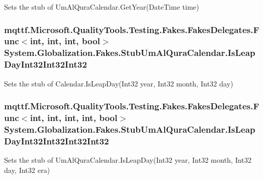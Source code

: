 Sets the stub of Um\-Al\-Qura\-Calendar.\-Get\-Year(\-Date\-Time time)

\hypertarget{class_system_1_1_globalization_1_1_fakes_1_1_stub_um_al_qura_calendar_af5b3de7affdaec6447af89aea8beb108}{
\subsubsection[{Is\-Leap\-Day\-Int32\-Int32\-Int32}]{\setlength{\rightskip}{0pt plus 5cm}mqttf.\-Microsoft.\-Quality\-Tools.\-Testing.\-Fakes.\-Fakes\-Delegates.\-Func$<$int, int, int, bool$>$ System.\-Globalization.\-Fakes.\-Stub\-Um\-Al\-Qura\-Calendar.\-Is\-Leap\-Day\-Int32\-Int32\-Int32}}\label{class_system_1_1_globalization_1_1_fakes_1_1_stub_um_al_qura_calendar_af5b3de7affdaec6447af89aea8beb108}


Sets the stub of Calendar.\-Is\-Leap\-Day(\-Int32 year, Int32 month, Int32 day)

\hypertarget{class_system_1_1_globalization_1_1_fakes_1_1_stub_um_al_qura_calendar_afceb2cc2031902f42f8fc2ebf1c36b23}{
\subsubsection[{Is\-Leap\-Day\-Int32\-Int32\-Int32\-Int32}]{\setlength{\rightskip}{0pt plus 5cm}mqttf.\-Microsoft.\-Quality\-Tools.\-Testing.\-Fakes.\-Fakes\-Delegates.\-Func$<$int, int, int, int, bool$>$ System.\-Globalization.\-Fakes.\-Stub\-Um\-Al\-Qura\-Calendar.\-Is\-Leap\-Day\-Int32\-Int32\-Int32\-Int32}}\label{class_system_1_1_globalization_1_1_fakes_1_1_stub_um_al_qura_calendar_afceb2cc2031902f42f8fc2ebf1c36b23}


Sets the stub of Um\-Al\-Qura\-Calendar.\-Is\-Leap\-Day(\-Int32 year, Int32 month, Int32 day, Int32 era)


